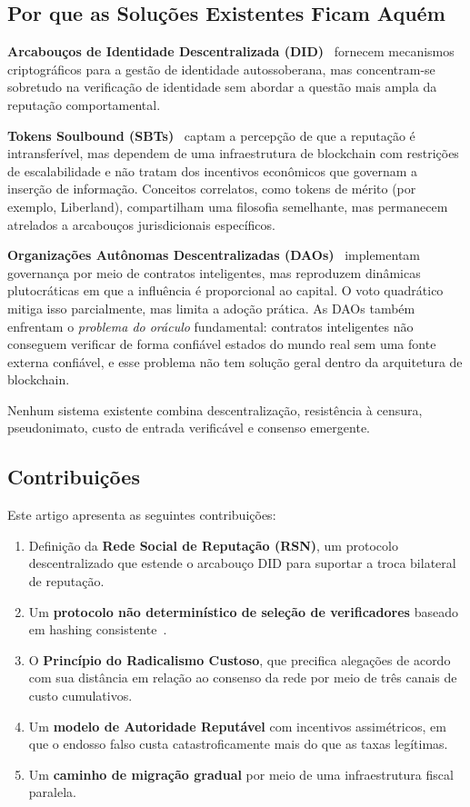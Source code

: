 \documentclass[11pt,a4paper,twocolumn]{article}
\begin{document}
\subsection{Por que as Soluções Existentes Ficam Aquém}

\textbf{Arcabouços de Identidade Descentralizada (DID)}~\cite{did2022} fornecem mecanismos criptográficos para a gestão de identidade autossoberana, mas concentram-se sobretudo na verificação de identidade sem abordar a questão mais ampla da reputação comportamental.

\textbf{Tokens Soulbound (SBTs)}~\cite{weyl2022} captam a percepção de que a reputação é intransferível, mas dependem de uma infraestrutura de blockchain com restrições de escalabilidade e não tratam dos incentivos econômicos que governam a inserção de informação. Conceitos correlatos, como tokens de mérito (por exemplo, Liberland), compartilham uma filosofia semelhante, mas permanecem atrelados a arcabouços jurisdicionais específicos.

\textbf{Organizações Autônomas Descentralizadas (DAOs)}~\cite{buterin2014} implementam governança por meio de contratos inteligentes, mas reproduzem dinâmicas plutocráticas em que a influência é proporcional ao capital. O voto quadrático~\cite{buterin2019} mitiga isso parcialmente, mas limita a adoção prática. As DAOs também enfrentam o \emph{problema do oráculo} fundamental: contratos inteligentes não conseguem verificar de forma confiável estados do mundo real sem uma fonte externa confiável, e esse problema não tem solução geral dentro da arquitetura de blockchain.

Nenhum sistema existente combina descentralização, resistência à censura, pseudonimato, custo de entrada verificável e consenso emergente.

\subsection{Contribuições}

Este artigo apresenta as seguintes contribuições:
\begin{enumerate}[nosep]
\item Definição da \textbf{Rede Social de Reputação (RSN)}, um protocolo descentralizado que estende o arcabouço DID para suportar a troca bilateral de reputação.
\item Um \textbf{protocolo não determinístico de seleção de verificadores} baseado em hashing consistente~\cite{karger1997}.
\item O \textbf{Princípio do Radicalismo Custoso}, que precifica alegações de acordo com sua distância em relação ao consenso da rede por meio de três canais de custo cumulativos.
\item Um \textbf{modelo de Autoridade Reputável} com incentivos assimétricos, em que o endosso falso custa catastroficamente mais do que as taxas legítimas.
\item Um \textbf{caminho de migração gradual} por meio de uma infraestrutura fiscal paralela.
\end{enumerate}
\end{document}

